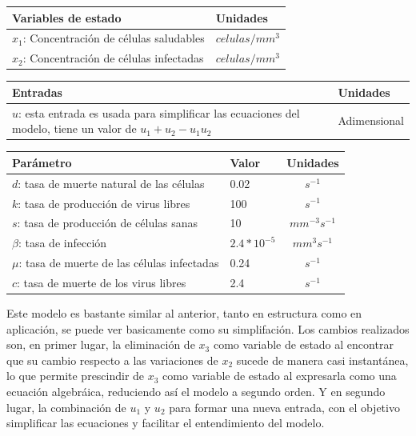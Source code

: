 \documentclass{article}
\begin{document}
    \begin{tabular}{|p{6cm} p{2.5cm}|}
        \hline
        \textbf{Variables de estado} & \textbf{Unidades} \\
        \hline
        $x_1$: Concentración de células saludables & $celulas / mm^3$\\
        $x_2$: Concentración de células infectadas & $celulas / mm^3$\\
        \hline
    \end{tabular}

    \vspace{0.5cm}

    \begin{tabular}{|p{8.5cm} p{2.5cm}|}
        \hline
        \textbf{Entradas} & \textbf{Unidades} \\
        \hline
        $u$: esta entrada es usada para simplificar las ecuaciones del modelo,
             tiene un valor de $u_1+u_2-u_1 u_2$ & Adimensional \\
        \hline
    \end{tabular}

    \vspace{0.5cm}

    \begin{tabular}{|p{7cm} p{2cm} c|}
        \hline
        \textbf{Parámetro} & \textbf{Valor} & \textbf{Unidades} \\
        \hline
        $d$: tasa de muerte natural de las células      & 0.02            & $s^{-1}$\\
        $k$: tasa de producción de virus libres         & 100             & $s^{-1}$\\
        $s$: tasa de producción de células sanas        & 10              & $mm^{-3} s^{-1}$\\
        $\beta$: tasa de infección                      & $2.4 * 10^{-5}$ & $mm^3 s^{-1}$\\
        $\mu$: tasa de muerte de las células infectadas & 0.24            & $s^{-1}$\\
        $c$: tasa de muerte de los virus libres         & 2.4             & $s^{-1}$\\
        \hline
    \end{tabular}

    \cite{model}

    \vspace{0.5cm}

Este modelo es bastante similar al anterior, tanto en estructura como en
aplicación, se puede ver basicamente como su simplifación. Los cambios
realizados son, en primer lugar, la eliminación de $x_3$ como variable de
estado al encontrar que su cambio respecto a las variaciones de $x_2$ sucede de
manera casi instantánea, lo que permite prescindir de $x_3$ como variable de
estado al expresarla como una ecuación algebráica, reduciendo así el modelo a
segundo orden.  Y en segundo lugar, la combinación de $u_1$ y $u_2$ para formar una
nueva entrada, con el objetivo simplificar las ecuaciones y facilitar el
entendimiento del modelo.
\end{document}
